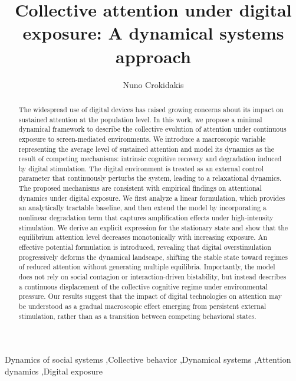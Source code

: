 \documentclass[preprint,12pt]{elsarticle}
\begin{document}
\begin{frontmatter}



\title{Collective attention under digital exposure: A dynamical systems approach}

\author{Nuno Crokidakis}



\address{Instituto de F\'{\i}sica, Universidade Federal Fluminense, Niter\'oi, Rio de Janeiro, Brazil}



\begin{abstract}
  The widespread use of digital devices has raised growing concerns about its impact on sustained attention at the population level. In this work, we propose a minimal dynamical framework to describe the collective evolution of attention under continuous exposure to screen-mediated environments. We introduce a macroscopic variable representing the average level of sustained attention and model its dynamics as the result of competing mechanisms: intrinsic cognitive recovery and degradation induced by digital stimulation. The digital environment is treated as an external control parameter that continuously perturbs the system, leading to a relaxational dynamics. The proposed mechanisms are consistent with empirical findings on attentional dynamics under digital exposure. We first analyze a linear formulation, which provides an analytically tractable baseline, and then extend the model by incorporating a nonlinear degradation term that captures amplification effects under high-intensity stimulation. We derive an explicit expression for the stationary state and show that the equilibrium attention level decreases monotonically with increasing exposure. An effective potential formulation is introduced, revealing that digital overstimulation progressively deforms the dynamical landscape, shifting the stable state toward regimes of reduced attention without generating multiple equilibria. Importantly, the model does not rely on social contagion or interaction-driven bistability, but instead describes a continuous displacement of the collective cognitive regime under environmental pressure. Our results suggest that the impact of digital technologies on attention may be understood as a gradual macroscopic effect emerging from persistent external stimulation, rather than as a transition between competing behavioral states.


\end{abstract}

\begin{keyword}
Dynamics of social systems \sep Collective behavior \sep Dynamical systems \sep Attention dynamics \sep Digital exposure 


\end{keyword}

\end{frontmatter}
\end{document}
